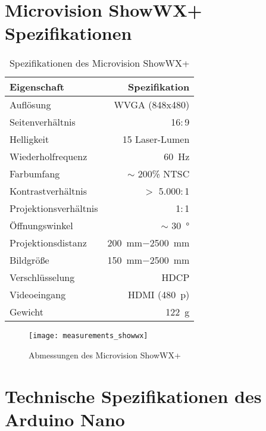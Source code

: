\section{Microvision ShowWX+ Spezifikationen}
\label{app:projector}
\begin{table}[!ht]
\caption{Spezifikationen des Microvision ShowWX+}
\begin{center}
\vspace{-3mm}
\begin{tabular}{|l|r|}
\hline
\rowcolor{lightgray} Eigenschaft & Spezifikation \\
\hline
Auflösung 	& WVGA (\SI{848}{}$\mathrm{x}$\SI{480}{}) \\
\hline
Seitenverhältnis & \SI{16}{}$:$\SI{9}{} \\
\hline
Helligkeit 	& \SI{15}{} Laser-Lumen \\
\hline
Wiederholfrequenz & \SI{60}{\Hz} \\
\hline
Farbumfang 	& $\sim$ \SI{200}{}\% NTSC \\
\hline
Kontrastverhältnis 	& $>$ \SI{5.000}{}$:$\SI{1}{} \\
\hline
Projektionsverhältnis 	& \SI{1}{}$:$\SI{1}{} \\
\hline
Öffnungswinkel & $\sim$ \SI{30}{°}\\
\hline
Projektionsdistanz 	& \SI{200}{\milli\meter}$-$\SI{2500}{\milli\meter} \\
\hline
Bildgröße 	& \SI{150}{\milli\meter}$-$\SI{2500}{\milli\meter} \\
\hline
Verschlüsselung 	& HDCP \\
\hline
Videoeingang & HDMI (\SI{480}{p}) \\
\hline
Gewicht 	& \SI{122}{\gram} \\
\hline
\end{tabular}
\end{center}
\label{tab:landmarks_f1}
\end{table}

\begin{figure}[hb]
\vspace{-5mm}
\begin{center}
		\texttt{[image: measurements\_showwx]}
\end{center}
\vspace{-5mm}
\caption{Abmessungen des Microvision ShowWX+}
\label{fig.specs_proj}
\end{figure}

\clearpage{}

\section{Technische Spezifikationen des Arduino Nano}
\label{app:arduino}

